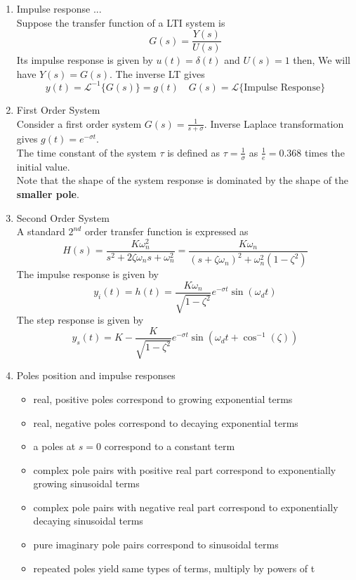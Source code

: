 \documentclass{article}
\begin{document}
\begin{enumerate}
    \item Impulse response ... \\
    Suppose the transfer function of a LTI system is
    \[G(s) = \frac{Y(s)}{U(s)}\]
    Its impulse response is given by $u(t) = \delta(t)$ and $U(s) = 1$ then, We will have $Y(s) = G(s)$. The inverse LT gives 
    \[y(t) = \mathscr{L}^{-1}\{G(s)\}=g(t) \quad G(s) = \mathscr{L}\{\text{Impulse Response}\}\]
    \item First Order System \\
    Consider a first order system $\displaystyle G(s) = \frac{1}{s+\sigma}$. Inverse Laplace transformation gives $g(t) = e^{-\sigma t}$. \\
    The time constant of the system $\tau$ is defined as $\displaystyle \tau = \frac{1}{\sigma}$ as $\displaystyle \frac{1}{e} = 0.368$ times the initial value. \\
    Note that the shape of the system response is dominated by the shape of the \textbf{smaller pole}.
    \item Second Order System \\
    A standard $2^{nd}$ order transfer function is expressed as
    \[H(s) = \frac{K \omega_n^2}{s^2 + 2 \zeta \omega_n s + \omega_n^2} = \frac{K \omega_n}{(s + \zeta \omega_n)^2 + \omega_n^2 (1 - \zeta^2)}\]
    The impulse response is given by
    \[y_i(t) = h(t) = \frac{K \omega_n}{\sqrt{1 - \zeta^2}} e^{-\sigma t} \sin(\omega_d t)\]
    The step response is given by
    \[y_s(t) = K - \frac{K}{\sqrt{1 - \zeta^2}} e^{-\sigma t} \sin(\omega_d t + \cos^{-1}(\zeta))\]
    \item Poles position and impulse responses
    \begin{itemize}
        \item real, positive poles correspond to growing exponential terms
        \item real, negative poles correspond to decaying exponential terms
        \item a poles at $s = 0$ correspond to a constant term
        \item complex pole pairs with positive real part correspond to exponentially growing sinusoidal terms
        \item complex pole pairs with negative real part correspond to exponentially decaying sinusoidal terms
        \item pure imaginary pole pairs correspond to sinusoidal terms
        \item repeated poles yield same types of terms, multiply by powers of t
    \end{itemize}
\end{enumerate}
\end{document}
